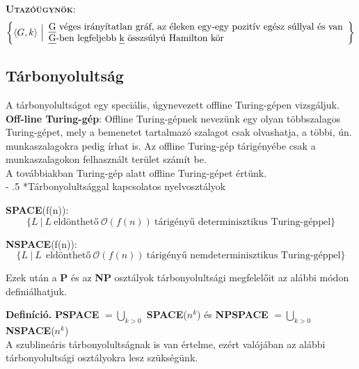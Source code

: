 \documentclass[tikz,12pt,margin=0px]{article}
\makeatletter
\renewcommand\paragraph{%
	\@startsection{paragraph}{4}{0mm}%
	{-\baselineskip}%
	{.5\baselineskip}%
	{\normalfont\normalsize\bfseries}}
\makeatother
\begin{document}
	\noindent \textsc{\textbf{Utazóügynök}}:\\
	\[\left\{\langle G, k \rangle \ \Big|
	\begin{array}{lr}
	 \text{\emph{G} véges irányítatlan gráf, az éleken egy-egy pozitív egész súllyal és van} \\ \text{\emph{G}-ben legfeljebb \emph{k} összsúlyú Hamilton kör}
	\end{array}
	 \right\}
    \]	
	
	\subsection*{Tárbonyolultság}

	A tárbonyolultságot egy speciális, úgynevezett offline Turing-gépen vizsgáljuk.\\
	
    \noindent \textbf{Off-line Turing-gép}: Offline Turing-gépnek nevezünk egy olyan többszalagos Turing-gépet, mely a bemenetet tartalmazó szalagot csak olvashatja, a többi, ún. munkaszalagokra	pedig írhat is. Az offline Turing-gép tárigényébe csak a munkaszalagokon felhasznált terület számít be.\\
	
	\noindent A továbbiakban Turing-gép alatt offline Turing-gépet értünk. \\
	
    \paragraph*{Tárbonyolultsággal kapcsolatos nyelvosztályok\\}

	\noindent \textbf{SPACE}(f(n)):
    \[
        \Big\{L\ \Big|\ L \ \text{eldönthető}\ \mathcal{O}(f(n))\ \text{tárigényű determinisztikus Turing-géppel} \Big\}
    \]


	\noindent \textbf{NSPACE}(f(n)):
    \[
        \Big\{L\ \Big|\ L\ \ \text{eldönthető}\ \mathcal{O}(f(n))\ \text{tárigényű nemdeterminisztikus Turing-géppel} \Big\}
    \]
	
    \noindent Ezek után a \textbf{P} és az \textbf{NP} osztályok tárbonyolultsági megfelelőit az alábbi módon definiálhatjuk.

	\noindent \textbf{Definíció.} \textbf{PSPACE} $=\bigcup\limits_{k > 0}$ \textbf{SPACE}($n^{k}$) és \noindent \textbf{NPSPACE} $=\bigcup\limits_{k > 0}$ \textbf{NSPACE}($n^{k}$)\\

    \noindent A szublineáris tárbonyolultságnak is van értelme, ezért valójában az alábbi tárbonyolultsági osztályokra lesz szükségünk.\\
	
\end{document}
